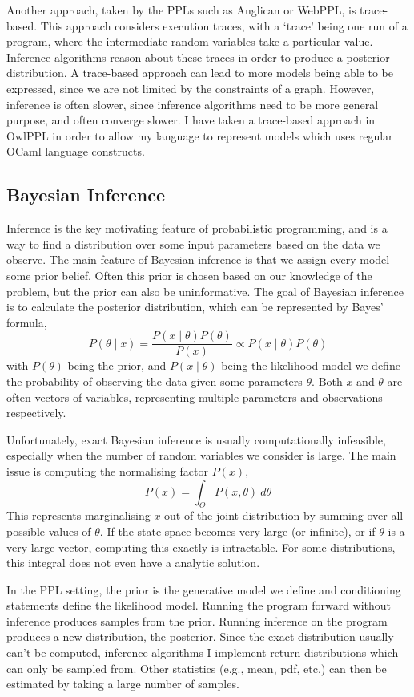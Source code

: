 \documentclass[sigconf]{acmart}
\begin{document}
Another approach, taken by the PPLs such as Anglican or WebPPL, is trace-based. This approach considers execution traces, with a `trace' being one run of a program, where the intermediate random variables take a particular value. Inference algorithms reason about these traces in order to produce a posterior distribution. A trace-based approach can lead to more models being able to be expressed, since we are not limited by the constraints of a graph. However, inference is often slower, since inference algorithms need to be more general purpose, and often converge slower. I have taken a trace-based approach in OwlPPL in order to allow my language to represent models which uses regular OCaml language constructs.

\subsection{Bayesian Inference}
Inference is the key motivating feature of probabilistic programming, and is a way to find a distribution over some input parameters based on the data we observe. The main feature of Bayesian inference is that we assign every model some prior belief. Often this prior is chosen based on our knowledge of the problem, but the prior can also be uninformative. The goal of Bayesian inference is to calculate the posterior distribution, which can be represented by Bayes' formula,
%
\[P(\theta\mid x)=\frac{P(x\mid\theta)P(\theta)}{P(x)}\propto{{P(x\mid\theta)P(\theta)}} \]
%
with $P(\theta)$ being the prior, and $P(x\mid \theta)$ being the likelihood model we define - the probability of observing the data given some parameters $\theta$. Both $x$ and $\theta$ are often vectors of variables, representing multiple parameters and observations respectively.

Unfortunately, exact Bayesian inference is usually computationally infeasible, especially when the number of random variables  we consider is large. The main issue is computing the normalising factor $P(x)$,
\[P(x)=\int_{\Theta}P(x,\theta)~d\theta\]
This represents marginalising $x$ out of the joint distribution by summing over all possible values of $\theta$. If the state space becomes very large (or infinite), or if $\theta$ is a very large vector, computing this exactly is intractable. For some distributions, this integral does not even have a analytic solution.

In the PPL setting, the prior is the generative model we define and conditioning statements define the likelihood model. Running the program forward without inference produces samples from the prior. Running inference on the program produces a new distribution, the posterior. Since the exact distribution usually can't be computed, inference algorithms I implement return distributions which can only be sampled from. Other statistics (e.g., mean, pdf, etc.) can then be estimated by taking a large number of samples.
\end{document}
